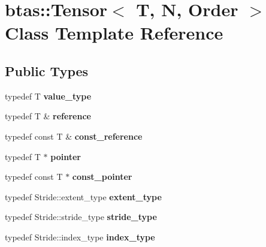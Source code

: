 \hypertarget{classbtas_1_1_tensor}{
\section{btas::Tensor$<$ T, N, Order $>$ Class Template Reference}
\label{classbtas_1_1_tensor}
}
\subsection*{Public Types}
\begin{DoxyCompactItemize}
\item 
\hypertarget{classbtas_1_1_tensor_aff4171f00a81c4bfa95fb39474af424b}{
typedef T {\bfseries value\_\-type}}
\label{classbtas_1_1_tensor_aff4171f00a81c4bfa95fb39474af424b}

\item 
\hypertarget{classbtas_1_1_tensor_a614333eb849048658b05730a750fe4b7}{
typedef T \& {\bfseries reference}}
\label{classbtas_1_1_tensor_a614333eb849048658b05730a750fe4b7}

\item 
\hypertarget{classbtas_1_1_tensor_a2234ce38908bf25d0e683b806f0a465d}{
typedef const T \& {\bfseries const\_\-reference}}
\label{classbtas_1_1_tensor_a2234ce38908bf25d0e683b806f0a465d}

\item 
\hypertarget{classbtas_1_1_tensor_a207a2f619f71bb3b406d70c1a3a62e59}{
typedef T $\ast$ {\bfseries pointer}}
\label{classbtas_1_1_tensor_a207a2f619f71bb3b406d70c1a3a62e59}

\item 
\hypertarget{classbtas_1_1_tensor_a9b70f8c1579a71af4250a5629fcee8c5}{
typedef const T $\ast$ {\bfseries const\_\-pointer}}
\label{classbtas_1_1_tensor_a9b70f8c1579a71af4250a5629fcee8c5}

\item 
\hypertarget{classbtas_1_1_tensor_a961300ceb1c9d10bfff2e5b3d3965c8c}{
typedef Stride::extent\_\-type {\bfseries extent\_\-type}}
\label{classbtas_1_1_tensor_a961300ceb1c9d10bfff2e5b3d3965c8c}

\item 
\hypertarget{classbtas_1_1_tensor_a53f25386bd077a43e62c2435d89bd2d2}{
typedef Stride::stride\_\-type {\bfseries stride\_\-type}}
\label{classbtas_1_1_tensor_a53f25386bd077a43e62c2435d89bd2d2}

\item 
\hypertarget{classbtas_1_1_tensor_a4e293acd0aa7481702c3b9a6da11b71f}{
typedef Stride::index\_\-type {\bfseries index\_\-type}}
\label{classbtas_1_1_tensor_a4e293acd0aa7481702c3b9a6da11b71f}


\end{DoxyCompactItemize}
